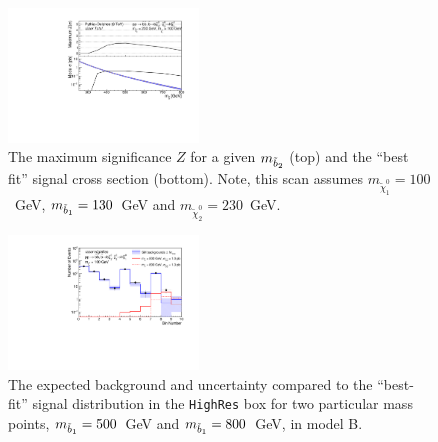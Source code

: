\begin{figure}[htb]
\includegraphics[width=0.45\textwidth]{figs/pheno/signif_T2bH_100_Total.pdf}
\caption{\label{fig:T21bH1dSignif} The maximum significance $Z$ for a
  given $m_{\tilde{b}_2}$ (top) and the ``best fit'' signal cross
  section (bottom). Note, this scan assumes
  $m_{\tilde\chi_1^0}=100$~GeV, $m_{\tilde{b}_1}=130$~GeV  and $m_{\tilde{\chi}_2^0}=230$~GeV.}
\end{figure}


\begin{figure}[htb]
\includegraphics[width=0.45\textwidth]{figs/pheno/obsexp_T2bH_HighRes.pdf}
\caption{\label{fig:T2bHExpObs500800} The expected background and
  uncertainty compared to the ``best-fit'' signal distribution in the \texttt{HighRes} box for two particular
  mass points, $m_{\tilde{b}_1}=500$~GeV and $m_{\tilde{b}_1}=800$~GeV, in model B.}
\end{figure}

